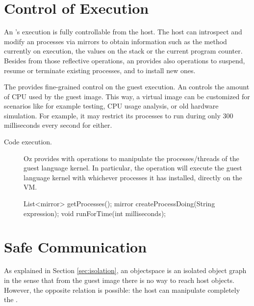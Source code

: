 \section{Control of Execution} \label{sec:execution}

An \objectspace's execution is fully controllable from the host. The host can introspect and modify an \objectspace processes via mirrors to obtain information such as the method currently on execution, the values on the stack or the current program counter. Besides from those reflective operations, an \objectspace provides also operations to suspend, resume or terminate existing processes, and to install new ones.

The \objectspace provides fine-grained control on the guest execution. An \objectspace controls the amount of CPU used by the guest image. This way, a virtual image can be customized for scenarios like for example testing, CPU usage analysis, or old hardware simulation. For example, it may restrict its processes to run during only 300 milliseconds every second for either.


\begin{description}
\item[Code execution.] Oz provides with operations to manipulate the processes/threads of the guest language kernel. In particular, the  operation will execute the guest language kernel with whichever processes it has installed, directly on the VM.
\begin{code}
List<mirror> getProcesses();
mirror createProcessDoing(String expression);
void runForTime(int milliseconds);
\end{code}
\end{description}

\section{Safe Communication} \label{sec:communication}


As explained in Section \ref{sec:isolation}, an objectspace is an isolated object graph in the sense that from the guest image there is no way to reach host objects. However, the opposite relation is possible: the host can manipulate completely the \objectspace.

